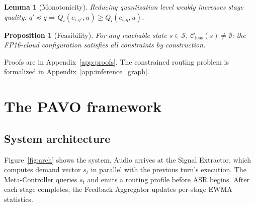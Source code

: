 \documentclass{article}
\newtheorem{proposition}[theorem]{Proposition}
\newtheorem{lemma}[theorem]{Lemma}
\begin{document}
\begin{lemma}[Monotonicity]
\label{lem:mono}
Reducing quantization level weakly increases stage quality: $q'\preceq q \Rightarrow Q_i(c_{i,q'},u)\geq Q_i(c_{i,q},u)$.
\end{lemma}

\begin{proposition}[Feasibility]
\label{prop:feasible}
For any reachable state $s\in\mathcal{S}$, $\mathcal{C}_{\mathrm{feas}}(s)\neq\emptyset$: the FP16-cloud configuration satisfies all constraints by construction.
\end{proposition}

Proofs are in Appendix~\ref{app:proofs}. The constrained routing problem is formalized in Appendix~\ref{app:inference_graph}.

\section{The PAVO framework}
\label{sec:arch}

\subsection{System architecture}

Figure~\ref{fig:arch} shows the system. Audio arrives at the Signal Extractor, which computes demand vector $s_t$ in parallel with the previous turn's execution. The Meta-Controller queries $s_t$ and emits a routing profile before ASR begins. After each stage completes, the Feedback Aggregator updates per-stage EWMA statistics.
\end{document}
